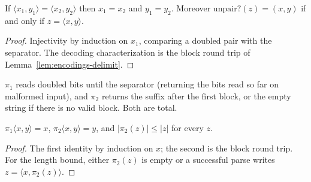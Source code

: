 \begin{lemma}
  \label{lem:encodings-pair-inj}
  \leanok
  If $\langle x_1, y_1 \rangle = \langle x_2, y_2 \rangle$ then $x_1 = x_2$ and
  $y_1 = y_2$. Moreover $\mathrm{unpair?}(z) = (x, y)$ if and only if
  $z = \langle x, y \rangle$.
\end{lemma}
\begin{proof}
  \leanok
  Injectivity by induction on $x_1$, comparing a doubled pair with the
  separator. The decoding characterization is the block round trip of
  Lemma~\ref{lem:encodings-delimit}.
\end{proof}

\begin{definition}[Projections]
  \label{def:encodings-pair-proj}
  \leanok
  $\pi_1$ reads doubled bits until the separator (returning the bits read so
  far on malformed input), and $\pi_2$ returns the suffix after the first
  block, or the empty string if there is no valid block. Both are total.
\end{definition}

\begin{lemma}
  \label{lem:encodings-pair-proj}
  \leanok
  $\pi_1 \langle x, y \rangle = x$, $\pi_2 \langle x, y \rangle = y$, and
  $|\pi_2(z)| \le |z|$ for every $z$.
\end{lemma}
\begin{proof}
  \leanok
  The first identity by induction on $x$; the second is the block round trip.
  For the length bound, either $\pi_2(z)$ is empty or a successful parse
  writes $z = \langle x, \pi_2(z) \rangle$.
\end{proof}

